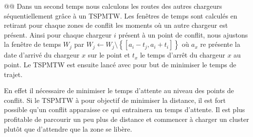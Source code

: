 \documentclass[noposter]{polytech}
\newcommand{\prive}[1]{\setminus\left\lbrace #1\right\rbrace}
\begin{document}
\begin{easylist}
		@@ Dans un second temps nous calculons les routes des autres chargeurs séquentiellement grâce à un TSPMTW.
		Les fenêtres de temps sont calculés en retirant pour chaque zones de conflit les moments où un autre chargeur est présent.
		Ainsi pour chaque chargeur $i$ présent à un point de conflit, nous ajustons la fenêtre de temps $W_j$ par $W_j\leftarrow W_j\prive{\left[a_i-t_j, a_i+t_i\right]}$ où $a_x$ re présente la date d'arrivé du chargeur $x$ sur le point et $t_x$ le temps d'arrêt du chargeur $x$ au point.
		Le TSPMTW est ensuite lancé avec pour but de minimiser le temps de trajet.
		
		En effet il nécessaire de minimiser le temps d'attente au niveau des points de conflit.
		Si le TSPMTW à pour objectif de minimiser la distance, il est fort possible qu'un conflit apparaisse ce qui entrainera un temps d'attente.
		Il est plus profitable de parcourir un peu plus de distance et commencer à charger un cluster plutôt que d'attendre que la zone se libère.
	\end{easylist}
	
\end{document}
